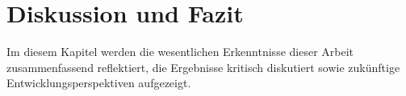 \section{Diskussion und Fazit}

Im diesem Kapitel werden die wesentlichen Erkenntnisse dieser Arbeit zusammenfassend reflektiert, die Ergebnisse kritisch diskutiert sowie zukünftige Entwicklungsperspektiven aufgezeigt.
